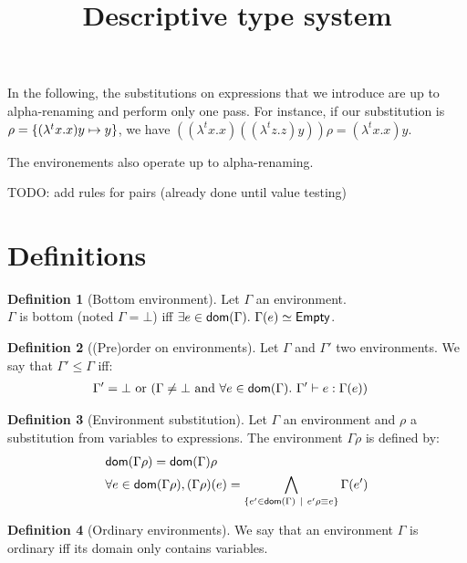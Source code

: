 \documentclass[a4paper]{article}
\title{\vspace{1.5cm}Descriptive type system}
\author{}
\date{\vspace{-5ex}}
\theoremstyle{definition}
\newtheorem{definition}{Definition}
\begin{document}
  \maketitle

  In the following, the substitutions on expressions that we introduce are up to alpha-renaming and perform only one pass.
  For instance, if our substitution is $\rho=\{(\lambda^t x. x) y \mapsto y\}$, we have $((\lambda^t x. x)((\lambda^t z. z) y))\rho = (\lambda^t x. x) y$.
  
  The environements also operate up to alpha-renaming.

  TODO: add rules for pairs (already done until value testing)

    \section{Definitions}

    \begin{definition}[Bottom environment]
      Let $\Gamma$ an environment.\\
      $\Gamma$ is bottom (noted $\Gamma = \bot$) iff $\exists e\in\dom\Gamma.\ \Gamma(e)\simeq\Empty$.
    \end{definition}

      \begin{definition}[(Pre)order on environments]
        Let $\Gamma$ and $\Gamma'$ two environments. We say that $\Gamma' \leq \Gamma$ iff:
        \begin{align*}
          &\Gamma'=\bot \text{ or } (\Gamma\neq\bot \text{ and } \forall e \in \textsf{dom}(\Gamma).\ \Gamma' \vdash e : \Gamma(e))
        \end{align*}
      \end{definition}
    
      \begin{definition}[Environment substitution]
        Let $\Gamma$ an environment and $\rho$ a substitution from variables to expressions.
        The environment $\Gamma\rho$ is defined by:
        \begin{align*}
          &\textsf{dom}(\Gamma\rho) = \textsf{dom}(\Gamma) \rho\\
          &\forall e \in \textsf{dom}(\Gamma\rho), (\Gamma\rho)(e) = \bigwedge_{\{e' \in \textsf{dom}(\Gamma) ~|~ e'\rho\equiv e\}}\Gamma(e')
        \end{align*}
      \end{definition}
    
      \begin{definition}[Ordinary environments]
        We say that an environment $\Gamma$ is ordinary iff its domain only contains variables.
      \end{definition}
\end{document}
